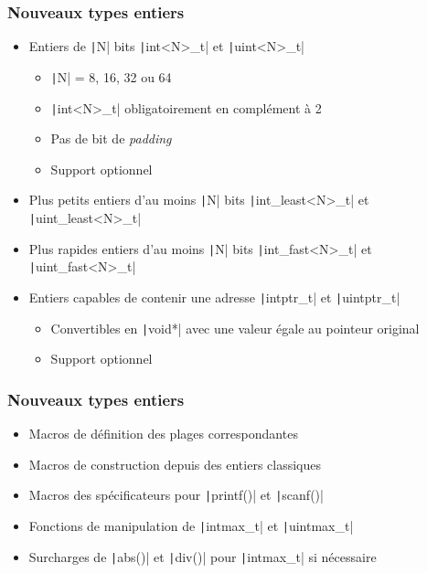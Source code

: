 \documentclass[C++.tex]{subfiles}
\begin{document}
\begin{frame}[fragile]
	\frametitle{Nouveaux types entiers}
	\begin{itemize}
		\item Entiers de \texttt|N| bits \texttt|int<N>_t| et \texttt|uint<N>_t|
		\begin{itemize}
			\item \texttt|N| = 8, 16, 32 ou 64
			\item \texttt|int<N>_t| obligatoirement en complément à 2


			\item Pas de bit de \textit{padding}
			\item Support optionnel
		\end{itemize}
		\item Plus petits entiers d'au moins \texttt|N| bits \texttt|int_least<N>_t| et \texttt|uint_least<N>_t|
		\item Plus rapides entiers d'au moins \texttt|N| bits \texttt|int_fast<N>_t| et \texttt|uint_fast<N>_t|
		\item Entiers capables de contenir une adresse \texttt|intptr_t| et \texttt|uintptr_t|
		\begin{itemize}
			\item Convertibles en \texttt|void*| avec une valeur égale au pointeur original
			\item Support optionnel
		\end{itemize}
	\end{itemize}
\end{frame}

\begin{frame}[fragile]
	\frametitle{Nouveaux types entiers}
	\begin{itemize}
		\item Macros de définition des plages correspondantes
		\item Macros de construction depuis des entiers classiques
		\item Macros des spécificateurs pour \texttt|printf()| et \texttt|scanf()|
		\item Fonctions de manipulation de \texttt|intmax_t| et \texttt|uintmax_t|
		\item Surcharges de \texttt|abs()| et \texttt|div()| pour \texttt|intmax_t| si nécessaire
	\end{itemize}
\end{frame}
\end{document}
